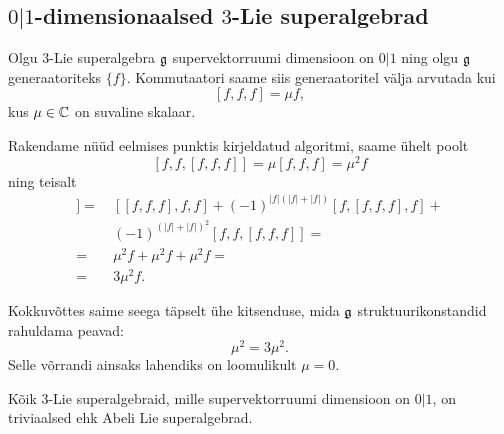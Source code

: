 
\subsection{\texorpdfstring{$0|1$}{0|1}-dimensionaalsed
    \texorpdfstring{$3$}{3}-Lie superalgebrad}

Olgu $3$-Lie superalgebra $\mathfrak{g}$ supervektorruumi dimensioon
on $0|1$ ning olgu $\mathfrak{g}$ generaatoriteks $\{ f \}$. Kommutaatori saame
siis generaatoritel välja arvutada kui
\[ [f, f, f] = \mu f, \]
kus $\mu \in \mathbb{C}$ on suvaline skalaar.

Rakendame nüüd eelmises punktis kirjeldatud algoritmi, saame ühelt poolt
\[
    [f, f, [f, f, f]] = \mu [f, f, f] = \mu^2 f
\]
ning teisalt
\begin{align*}
    [f, f, [f, f, f]] =&\
        [[f, f, f], f, f] +
        (-1)^{|f|(|f| + |f|)} [f, [f, f, f], f] + \\
        &\ (-1)^{(|f| + |f|)^2} [f, f, [f, f, f]] = \\
    =&\ \mu^2 f +  \mu^2 f +  \mu^2 f = \\
    =&\ 3\mu^2 f.
\end{align*}

Kokkuvõttes saime seega täpselt ühe kitsenduse, mida $\mathfrak{g}$ struktuurikonstandid
rahuldama peavad:
\[ \mu^2 = 3\mu^2. \]
Selle võrrandi ainsaks lahendiks on loomulikult $\mu = 0$.

\begin{thm}
    Kõik $3$-Lie superalgebraid, mille supervektorruumi dimensioon on $0|1$,
    on triviaalsed ehk Abeli Lie superalgebrad.
\end{thm}
